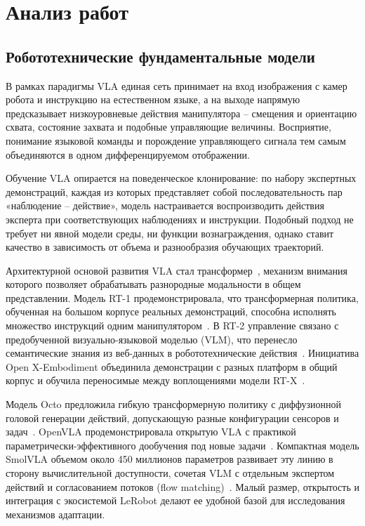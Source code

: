 \documentclass{misisarticle}
\begin{document}
\section{Анализ работ}

\subsection{Робототехнические фундаментальные модели}

В рамках парадигмы VLA единая сеть принимает на вход изображения с камер робота и инструкцию на естественном языке, а на выходе напрямую предсказывает низкоуровневые действия манипулятора -- смещения и ориентацию схвата, состояние захвата и подобные управляющие величины. Восприятие, понимание языковой команды и порождение управляющего сигнала тем самым объединяются в одном дифференцируемом отображении.

Обучение VLA опирается на поведенческое клонирование: по набору экспертных демонстраций, каждая из которых представляет собой последовательность пар «наблюдение -- действие», модель настраивается воспроизводить действия эксперта при соответствующих наблюдениях и инструкции. Подобный подход не требует ни явной модели среды, ни функции вознаграждения, однако ставит качество в зависимость от объема и разнообразия обучающих траекторий.

Архитектурной основой развития VLA стал трансформер~\cite{attention}, механизм внимания которого позволяет обрабатывать разнородные модальности в общем представлении. Модель RT-1 продемонстрировала, что трансформерная политика, обученная на большом корпусе реальных демонстраций, способна исполнять множество инструкций одним манипулятором~\cite{rt1}. В RT-2 управление связано с предобученной визуально-языковой моделью (VLM), что перенесло семантические знания из веб-данных в робототехнические действия~\cite{rt2}. Инициатива Open X-Embodiment объединила демонстрации с разных платформ в общий корпус и обучила переносимые между воплощениями модели RT-X~\cite{oxe}.

Модель Octo предложила гибкую трансформерную политику с диффузионной головой генерации действий, допускающую разные конфигурации сенсоров и задач~\cite{octo}. OpenVLA продемонстрировала открытую VLA с практикой параметрически-эффективного дообучения под новые задачи~\cite{openvla}. Компактная модель SmolVLA объемом около 450 миллионов параметров развивает эту линию в сторону вычислительной доступности, сочетая VLM с отдельным экспертом действий и согласованием потоков (flow matching)~\cite{smolvla}. Малый размер, открытость и интеграция с экосистемой LeRobot делают ее удобной базой для исследования механизмов адаптации.
\end{document}
